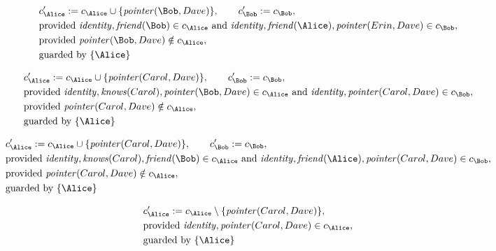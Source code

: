 \begin{align*}
&
c'_
{
\Alice
}
 := 
c_
{
\Alice
}
 \cup 
\{
\mathit{\detokenize{
pointer
}}
(
\Bob
,
Dave
)
\}
, \qquad 
c'_
{
\Bob
}
 := 
c_
{
\Bob
}
,\\
&
\text{provided } 
\mathit{\detokenize{
identity
}}
,
\mathit{\detokenize{
friend
}}
(
\Bob
)
 \in c_
{
\Alice
}
 \text{ and } 
\mathit{\detokenize{
identity
}}
,
\mathit{\detokenize{
friend
}}
(
\Alice
)
,
\mathit{\detokenize{
pointer
}}
(
Erin
,
Dave
)
 \in c_
{
\Bob
}
,\\
&
\text{provided } 
\mathit{\detokenize{
pointer
}}
(
\Bob
,
Dave
)
 \notin c_
{
\Alice
}
,\\
&
\text{guarded by } \{
\Alice
\}
\end{align*}

\begin{align*}
&
c'_
{
\Alice
}
 := 
c_
{
\Alice
}
 \cup 
\{
\mathit{\detokenize{
pointer
}}
(
Carol
,
Dave
)
\}
, \qquad 
c'_
{
\Bob
}
 := 
c_
{
\Bob
}
,\\
&
\text{provided } 
\mathit{\detokenize{
identity
}}
,
\mathit{\detokenize{
knows
}}
(
Carol
)
,
\mathit{\detokenize{
pointer
}}
(
\Bob
,
Dave
)
 \in c_
{
\Alice
}
 \text{ and } 
\mathit{\detokenize{
identity
}}
,
\mathit{\detokenize{
pointer
}}
(
Carol
,
Dave
)
 \in c_
{
\Bob
}
,\\
&
\text{provided } 
\mathit{\detokenize{
pointer
}}
(
Carol
,
Dave
)
 \notin c_
{
\Alice
}
,\\
&
\text{guarded by } \{
\Alice
\}
\end{align*}

\begin{align*}
&
c'_
{
\Alice
}
 := 
c_
{
\Alice
}
 \cup 
\{
\mathit{\detokenize{
pointer
}}
(
Carol
,
Dave
)
\}
, \qquad 
c'_
{
\Bob
}
 := 
c_
{
\Bob
}
,\\
&
\text{provided } 
\mathit{\detokenize{
identity
}}
,
\mathit{\detokenize{
knows
}}
(
Carol
)
,
\mathit{\detokenize{
friend
}}
(
\Bob
)
 \in c_
{
\Alice
}
 \text{ and } 
\mathit{\detokenize{
identity
}}
,
\mathit{\detokenize{
friend
}}
(
\Alice
)
,
\mathit{\detokenize{
pointer
}}
(
Carol
,
Dave
)
 \in c_
{
\Bob
}
,\\
&
\text{provided } 
\mathit{\detokenize{
pointer
}}
(
Carol
,
Dave
)
 \notin c_
{
\Alice
}
,\\
&
\text{guarded by } \{
\Alice
\}
\end{align*}

\begin{align*}
&
c'_
{
\Alice
}
 := 
c_
{
\Alice
}
 \setminus 
\{
\mathit{\detokenize{
pointer
}}
(
Carol
,
Dave
)
\}
,\\
&
\text{provided } 
\mathit{\detokenize{
identity
}}
,
\mathit{\detokenize{
pointer
}}
(
Carol
,
Dave
)
 \in c_
{
\Alice
}
,\\
&
\text{guarded by } \{
\Alice
\}
\end{align*}
